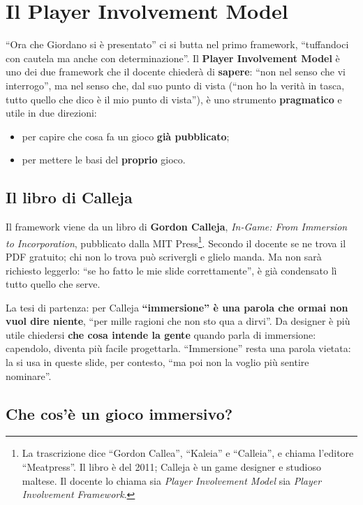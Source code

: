 \section{Il Player Involvement Model}
\label{a3:sec:pim}

``Ora che Giordano si è presentato'' ci si butta nel primo framework,
``tuffandoci con cautela ma anche con determinazione''. Il \textbf{Player
Involvement Model} è uno dei due framework che il docente chiederà di
\textbf{sapere}: ``non nel senso che vi interrogo'', ma nel senso che, dal suo
punto di vista (``non ho la verità in tasca, tutto quello che dico è il mio punto
di vista''), è uno strumento \textbf{pragmatico} e utile in due direzioni:
\begin{itemize}
  \item per capire che cosa fa un gioco \textbf{già pubblicato};
  \item per mettere le basi del \textbf{proprio} gioco.
\end{itemize}

\subsection{Il libro di Calleja}

Il framework viene da un libro di \textbf{Gordon Calleja}, \emph{In-Game: From
Immersion to Incorporation}, pubblicato dalla MIT Press\footnote{La
trascrizione dice ``Gordon Callea'', ``Kaleia'' e ``Calleia'', e chiama
l'editore ``Meatpress''. Il libro è del 2011; Calleja è un game designer e
studioso maltese. Il docente lo chiama sia \emph{Player Involvement Model} sia
\emph{Player Involvement Framework}.}. Secondo il docente se ne trova il PDF
gratuito; chi non lo trova può scrivergli e glielo manda. Ma non sarà richiesto
leggerlo: ``se ho fatto le mie slide correttamente'', è già condensato lì tutto
quello che serve.

La tesi di partenza: per Calleja \textbf{``immersione'' è una parola che ormai
non vuol dire niente}, ``per mille ragioni che non sto qua a dirvi''. Da
designer è più utile chiedersi \textbf{che cosa intende la gente} quando parla di
immersione: capendolo, diventa più facile progettarla. ``Immersione'' resta una
parola vietata: la si usa in queste slide, per contesto, ``ma poi non la voglio
più sentire nominare''.

\subsection{Che cos'è un gioco immersivo?}

